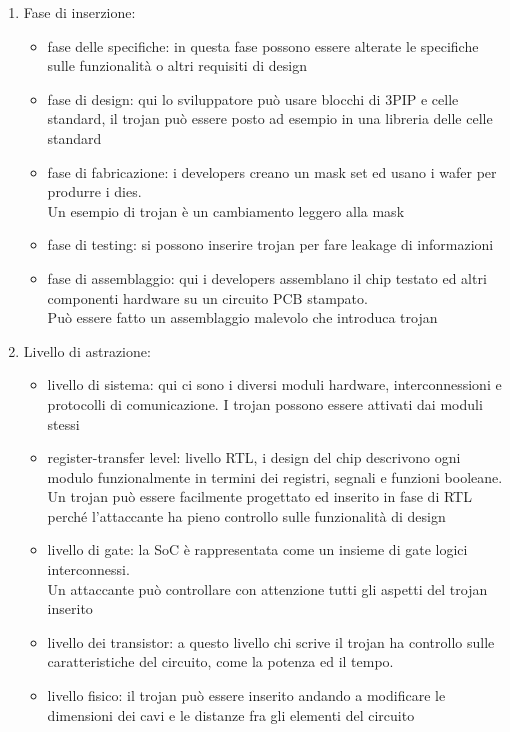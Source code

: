 \documentclass[oneside, 12pt]{extbook}
\begin{document}
\begin{enumerate}
	\item Fase di inserzione:
	\begin{itemize}
		\item fase delle specifiche: in questa fase possono essere alterate le specifiche sulle funzionalità o altri requisiti di design
		\item fase di design: qui lo sviluppatore può usare blocchi di 3PIP e celle standard, il trojan può essere posto ad esempio in una libreria delle celle standard
		\item fase di fabricazione: i developers creano un mask set ed usano i wafer per produrre i dies.
		\\Un esempio di trojan è un cambiamento leggero alla mask
		\item fase di testing: si possono inserire trojan per fare leakage di informazioni
		\item fase di assemblaggio: qui i developers assemblano il chip testato ed altri componenti hardware su un circuito PCB stampato.
		\\Può essere fatto un assemblaggio malevolo che introduca trojan
	\end{itemize}
	\item Livello di astrazione:
	\begin{itemize}
		\item livello di sistema: qui ci sono i diversi moduli hardware, interconnessioni e protocolli di comunicazione. I trojan possono essere attivati dai moduli stessi
		\item register-transfer level: livello RTL, i design del chip descrivono ogni modulo funzionalmente in termini dei registri, segnali e funzioni booleane.
		\\Un trojan può essere facilmente progettato ed inserito in fase di RTL perché l'attaccante ha pieno controllo sulle funzionalità di design
		\item livello di gate: la SoC è rappresentata come un insieme di gate logici interconnessi.
		\\Un attaccante può controllare con attenzione tutti gli aspetti del trojan inserito
		\item livello dei transistor: a questo livello chi scrive il trojan ha controllo sulle caratteristiche del circuito, come la potenza ed il tempo.
		\item livello fisico: il trojan può essere inserito andando a modificare le dimensioni dei cavi e le distanze fra gli elementi del circuito
	\end{itemize}

\end{enumerate}
\end{document}
